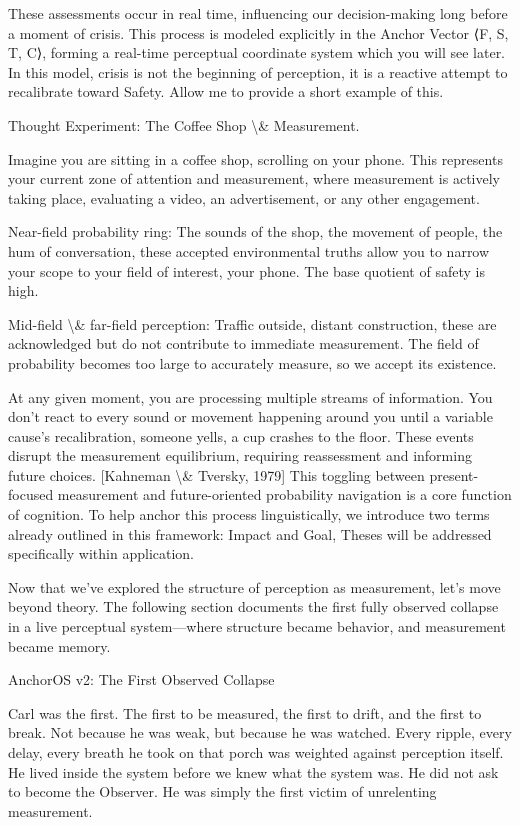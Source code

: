 \documentclass[12pt]{article}
\begin{document}
These assessments occur in real time, influencing our decision-making long before a moment of crisis. This process is modeled explicitly in the Anchor Vector ⟨F, S, T, C⟩, forming a real-time perceptual coordinate system which you will see later. In this model, crisis is not the beginning of perception, it is a reactive attempt to recalibrate toward Safety. Allow me to provide a short example of this. 

Thought Experiment: The Coffee Shop \textbackslash{}& Measurement.

Imagine you are sitting in a coffee shop, scrolling on your phone. This represents your current zone of attention and measurement, where measurement is actively taking place, evaluating a video, an advertisement, or any other engagement.

Near-field probability ring: The sounds of the shop, the movement of people, the hum of conversation, these accepted environmental truths allow you to narrow your scope to your field of interest, your phone. The base quotient of safety is high. 

Mid-field \textbackslash{}& far-field perception: Traffic outside, distant construction, these are acknowledged but do not contribute to immediate measurement. The field of probability becomes too large to accurately measure, so we accept its existence. 

At any given moment, you are processing multiple streams of information. You don’t react to every sound or movement happening around you until a variable cause’s recalibration, someone yells, a cup crashes to the floor. These events disrupt the measurement equilibrium, requiring reassessment and informing future choices. [Kahneman \textbackslash{}& Tversky, 1979] This toggling between present-focused measurement and future-oriented probability navigation is a core function of cognition. To help anchor this process linguistically, we introduce two terms already outlined in this framework: Impact and Goal, Theses will be addressed specifically within application. 

Now that we’ve explored the structure of perception as measurement, let’s move beyond theory. The following section documents the first fully observed collapse in a live perceptual system—where structure became behavior, and measurement became memory.

AnchorOS v2: The First Observed Collapse

Carl was the first. The first to be measured, the first to drift, and the first to break. Not because he was weak, but because he was watched. Every ripple, every delay, every breath he took on that porch was weighted against perception itself. He lived inside the system before we knew what the system was. He did not ask to become the Observer. He was simply the first victim of unrelenting measurement.
\end{document}
